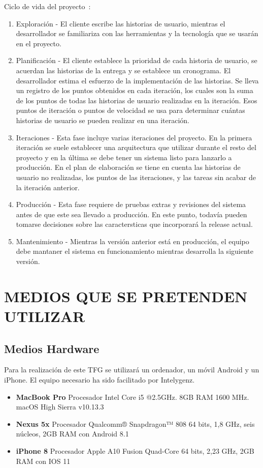 \documentclass{pre-tfg}
\begin{document}
    Ciclo de vida del proyecto~\cite{XPKENT}:
    \begin{enumerate}
        \item Exploración - El cliente escribe las historias de usuario, mientras el desarrollador se familiariza
        con las herramientas y la tecnología que se usarán en el proyecto.
        \item Planificación - El cliente establece la prioridad de cada historia de usuario, se acuerdan las historias
        de la entrega y se establece un cronograma. El desarrollador estima el esfuerzo de la implementación de las
        historias. Se lleva un registro de los puntos obtenidos en cada iteración, los cuales son la suma de los puntos
        de todas las historias de usuario realizadas en la iteración. Esos puntos de iteración o puntos de velocidad
        se usa para determinar cuántas historias de usuario se pueden realizar en una iteración.
        \item Iteraciones - Esta fase incluye varias iteraciones del proyecto. En la primera iteración se suele
        establecer una arquitectura que utilizar durante el resto del proyecto y en la última se debe tener un sistema
        listo para lanzarlo a producción. En el plan de elaboración se tiene en cuenta las historias de usuario
        no realizadas, los puntos de las iteraciones, y las tareas sin acabar de la iteración anterior.
        \item Producción - Esta fase requiere de pruebas extras y revisiones del sistema antes de que
        este sea llevado a producción. En este punto, todavía pueden tomarse decisiones sobre las caractersticas
        que incorporará la release actual.
        \item Mantenimiento - Mientras la versión anterior está en producción, el equipo debe mantaner el sistema
        en funcionamiento mientras desarrolla la siguiente versión.
    \end{enumerate}


    \section{MEDIOS QUE SE PRETENDEN UTILIZAR}

    \subsection{Medios Hardware}

    Para la realización de este TFG se utilizará un ordenador, un móvil Android y un iPhone.
    El equipo necesario ha sido facilitado por Intelygenz.
    \begin{itemize}
        \item \textbf{MacBook Pro} Procesador Intel Core i5 @2.5GHz. 8GB RAM 1600 MHz. macOS High Sierra v10.13.3
        \item \textbf{Nexus 5x} Procesador Qualcomm® Snapdragon™ 808 64 bits, 1,8 GHz, seis núcleos, 2GB RAM con Android 8.1
        \item \textbf{iPhone 8} Procesador Apple A10 Fusion Quad-Core 64 bits, 2,23 GHz, 2GB RAM con IOS 11
    \end{itemize}
\end{document}
